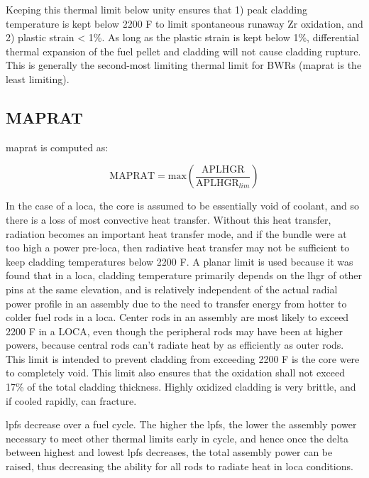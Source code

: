 \documentclass[10pt]{article}
\begin{document}
Keeping this thermal limit below unity ensures that 1) peak cladding temperature is kept below 2200 \degree F to limit spontaneous runaway Zr oxidation, and 2) plastic strain < 1\%. As long as the plastic strain is kept below 1\%, differential thermal expansion of the fuel pellet and cladding will not cause cladding rupture. This is generally the second-most limiting thermal limit for BWRs (\gls{maprat} is the least limiting). 

\subsection{MAPRAT}

\gls{maprat} is computed as:

\begin{equation}
\textrm{MAPRAT}=\textrm{max}\left(\frac{\textrm{APLHGR}}{\textrm{APLHGR}_{lim}}\right)
\end{equation}

In the case of a \gls{loca}, the core is assumed to be essentially void of coolant, and so there is a loss of most convective heat transfer. Without this heat transfer, radiation becomes an important heat transfer mode, and if the bundle were at too high a power pre-\gls{loca}, then radiative heat transfer may not be sufficient to keep cladding temperatures below 2200 \degree F. A planar limit is used because it was found that in a \gls{loca}, cladding temperature primarily depends on the \gls{lhgr} of other pins at the same elevation, and is relatively independent of the actual radial power profile in an assembly due to the need to transfer energy from hotter to colder fuel rods in a \gls{loca}. Center rods in an assembly are most likely to exceed 2200 \degree F in a LOCA, even though the peripheral rods may have been at higher powers, because central rods can't radiate heat by as efficiently as outer rods. This limit is intended to prevent cladding from exceeding 2200 \degree F is the core were to completely void. This limit also ensures that the oxidation shall not exceed 17\% of the total cladding thickness. Highly oxidized cladding is very brittle, and if cooled rapidly, can fracture. 

\gls{lpf}s decrease over a fuel cycle. The higher the \gls{lpf}s, the lower the assembly power necessary to meet other thermal limits early in cycle, and hence once the delta between highest and lowest \gls{lpf}s decreases, the total assembly power can be raised, thus decreasing the ability for all rods to radiate heat in \gls{loca} conditions.
\end{document}

